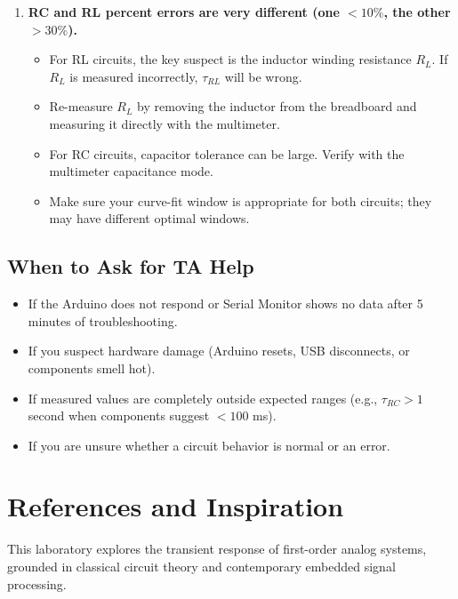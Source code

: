 \documentclass[11pt,letterpaper]{article}
\begin{document}
\begin{enumerate}
    \item \textbf{RC and RL percent errors are very different (one $<10\%$, the other $>30\%$).}
    \begin{itemize}
        \item For RL circuits, the key suspect is the inductor winding resistance $R_L$. If $R_L$ is measured incorrectly, $\tau_{RL}$ will be wrong.
        \item Re-measure $R_L$ by removing the inductor from the breadboard and measuring it directly with the multimeter.
        \item For RC circuits, capacitor tolerance can be large. Verify with the multimeter capacitance mode.
        \item Make sure your curve-fit window is appropriate for both circuits; they may have different optimal windows.
    \end{itemize}
\end{enumerate}

\subsection*{When to Ask for TA Help}

\begin{itemize}
    \item If the Arduino does not respond or Serial Monitor shows no data after 5 minutes of troubleshooting.
    \item If you suspect hardware damage (Arduino resets, USB disconnects, or components smell hot).
    \item If measured values are completely outside expected ranges (e.g., $\tau_{RC} > 1$ second when components suggest $< 100$ ms).
    \item If you are unsure whether a circuit behavior is normal or an error.
\end{itemize}

\clearpage

\section*{References and Inspiration}

This laboratory explores the transient response of first-order analog systems, grounded in classical circuit theory and contemporary embedded signal processing.
\end{document}
